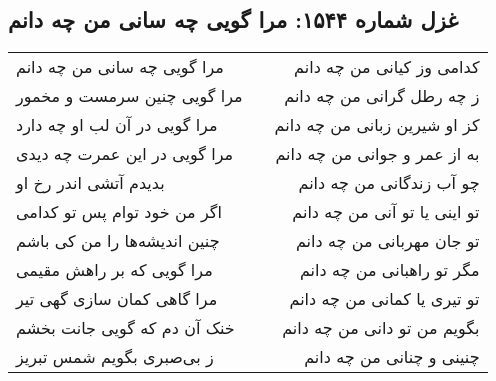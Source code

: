 \begin{center}
\section*{غزل شماره ۱۵۴۴: مرا گویی چه سانی من چه دانم}
\label{sec:1544}
\begin{longtable}{l p{0.5cm} r}
مرا گویی چه سانی من چه دانم
&&
کدامی وز کیانی من چه دانم
\\
مرا گویی چنین سرمست و مخمور
&&
ز چه رطل گرانی من چه دانم
\\
مرا گویی در آن لب او چه دارد
&&
کز او شیرین زبانی من چه دانم
\\
مرا گویی در این عمرت چه دیدی
&&
به از عمر و جوانی من چه دانم
\\
بدیدم آتشی اندر رخ او
&&
چو آب زندگانی من چه دانم
\\
اگر من خود توام پس تو کدامی
&&
تو اینی یا تو آنی من چه دانم
\\
چنین اندیشه‌ها را من کی باشم
&&
تو جان مهربانی من چه دانم
\\
مرا گویی که بر راهش مقیمی
&&
مگر تو راهبانی من چه دانم
\\
مرا گاهی کمان سازی گهی تیر
&&
تو تیری یا کمانی من چه دانم
\\
خنک آن دم که گویی جانت بخشم
&&
بگویم من تو دانی من چه دانم
\\
ز بی‌صبری بگویم شمس تبریز
&&
چنینی و چنانی من چه دانم
\\
\end{longtable}
\end{center}
